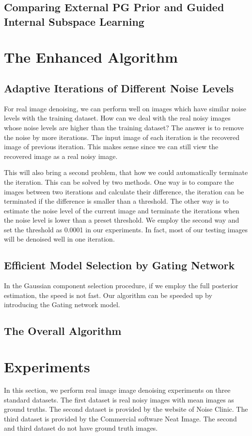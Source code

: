 \documentclass[10pt,twocolumn,letterpaper]{article}
\begin{document}
\subsection{Comparing External PG Prior and Guided Internal Subspace Learning}


\section{The Enhanced Algorithm}

\subsection{Adaptive Iterations of Different Noise Levels}
For real image denoising, we can perform well on images which have similar noise levels with the training dataset. How can we deal with the real noisy images whose noise levels are higher than the training dataset? The answer is to remove the noise by more iterations. The input image of each iteration is the recovered image of previous iteration. This makes sense since we can still view the recovered image as a real noisy image. 

This will also bring a second problem, that how we could automatically terminate the iteration. This can be solved by two methods. One way is to compare the images between two iterations and calculate their difference, the iteration can be terminated if the difference is smaller than a threshold. The other way is to estimate the noise level of the current image and terminate the iterations when the noise level is lower than a preset threshold. We employ the second way and set the threshold as 0.0001 in our experiments. In fact, most of our testing images will be denoised well in one iteration.

\subsection{Efficient Model Selection by Gating Network}
In the Gaussian component selection procedure, if we employ the full posterior estimation, the speed is not fast. Our algorithm can be speeded up by introducing the Gating network model.

\subsection{The Overall Algorithm}
\section{Experiments}
In this section, we perform real image image denoising experiments on three standard datasets. The first dataset is real noisy images with mean images as ground truths. The second dataset is provided by the website of Noise Clinic. The third dataset is provided by the Commercial software Neat Image. The second and third dataset do not have ground truth images.
\end{document}
